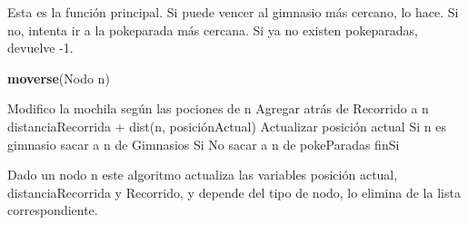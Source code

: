 \documentclass[spanish,12pt]{article}
\begin{document}
Esta es la función principal. Si puede vencer al gimnasio más cercano, lo hace. Si no, intenta ir a la pokeparada más cercana. Si ya no existen pokeparadas, devuelve -1.

\begin{algorithm}[H]{\textbf{moverse}(Nodo n)}
	\begin{algorithmic}[1]
		\State Modifico la mochila según las pociones de n
		\State Agregar atrás de Recorrido a n
		\State distanciaRecorrida + dist(n, posiciónActual)
		\State Actualizar posición actual
		\State Si n es gimnasio
		\State \quad sacar a n de Gimnasios
		\State Si No
		\State \quad sacar a n de pokeParadas
		\State finSi
	\end{algorithmic}
\end{algorithm}

Dado un nodo n este algoritmo actualiza las variables posición actual, distanciaRecorrida y Recorrido, y depende del tipo de nodo, lo elimina de la lista correspondiente.
\end{document}
